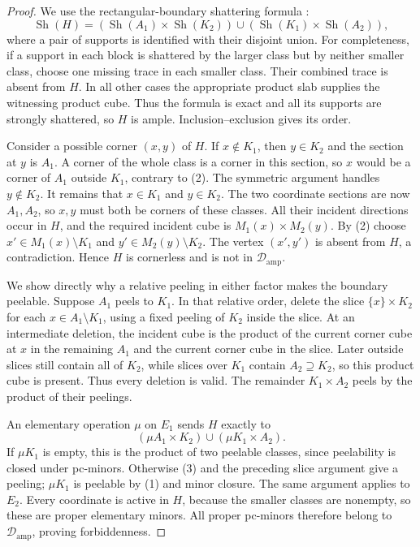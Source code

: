 \documentclass[11pt]{article}
\numberwithin{equation}{section}
\theoremstyle{definition}
\theoremstyle{remark}
\newcommand{\Damp}{\mathcal D_{\mathrm{amp}}}
\begin{document}
\begin{proof}
We use the rectangular-boundary shattering formula
\cite[Theorem \texttt{relative-rectangular-boundary-tensor-factorization}]
{BousquetPartitionability26}:
\[
 \operatorname{Sh}(H)=
 (\operatorname{Sh}(A_1)\times\operatorname{Sh}(K_2))
 \cup
 (\operatorname{Sh}(K_1)\times\operatorname{Sh}(A_2)),
\]
where a pair of supports is identified with their disjoint union.
For completeness, if a support in each block is shattered by the larger
class but by neither smaller class, choose one missing trace in each
smaller class. Their combined trace is absent from $H$. In all other
cases the appropriate product slab supplies the witnessing product cube.
Thus the formula is exact and all its supports are strongly shattered,
so $H$ is ample. Inclusion--exclusion gives its order.

Consider a possible corner $(x,y)$ of $H$. If $x\notin K_1$, then
$y\in K_2$ and the section at $y$ is $A_1$. A corner of the whole
class is a corner in this section, so $x$ would be a corner of $A_1$
outside $K_1$, contrary to (2). The symmetric argument handles
$y\notin K_2$. It remains that $x\in K_1$ and $y\in K_2$.
The two coordinate sections are now $A_1,A_2$, so $x,y$ must both
be corners of these classes. All their incident directions occur in
$H$, and the required incident cube is $M_1(x)\times M_2(y)$.
By (2) choose $x'\in M_1(x)\setminus K_1$ and
$y'\in M_2(y)\setminus K_2$. The vertex $(x',y')$ is absent from
$H$, a contradiction. Hence $H$ is cornerless and is not in $\Damp$.

We show directly why a relative peeling in either factor makes the
boundary peelable. Suppose $A_1$ peels to $K_1$. In that relative
order, delete the slice $\{x\}\times K_2$ for each
$x\in A_1\setminus K_1$, using a fixed peeling of $K_2$ inside the
slice. At an intermediate deletion, the incident cube is the product
of the current corner cube at $x$ in the remaining $A_1$ and the
current corner cube in the slice. Later outside slices still contain
all of $K_2$, while slices over $K_1$ contain $A_2\supseteq K_2$,
so this product cube is present. Thus every deletion is valid.
The remainder $K_1\times A_2$ peels by the product of their peelings.

An elementary operation $\mu$ on $E_1$ sends $H$ exactly to
\[
 (\mu A_1\times K_2)\cup(\mu K_1\times A_2).
\]
If $\mu K_1$ is empty, this is the product of two peelable classes,
since peelability is closed under pc-minors. Otherwise (3) and the
preceding slice argument give a peeling; $\mu K_1$ is peelable by
(1) and minor closure. The same argument applies to $E_2$.
Every coordinate is active in $H$, because the smaller classes are
nonempty, so these are proper elementary minors. All proper pc-minors
therefore belong to $\Damp$, proving forbiddenness.
\end{proof}
\end{document}
